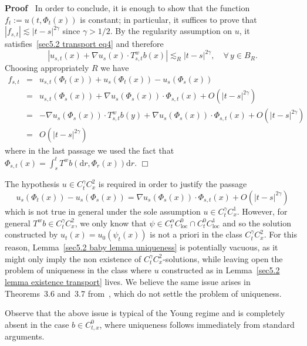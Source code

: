 \documentclass[10pt]{article}
\newcommand{\assign}{:=}
\newcommand{\mathd}{\mathrm{d}}
\newcommand{\tmop}[1]{\ensuremath{\operatorname{#1}}}
\newenvironment{proof}{\noindent\textbf{Proof\ }}{\hspace*{\fill}$\Box$\medskip}
\begin{document}
\begin{proof}
  In order to conclude, it is enough to show that the function $f_t \assign u
  (t, \Phi_t (x))$ is constant; in particular, it suffices to prove that $|
  f_{s, t} | \lesssim | t - s |^{2 \gamma}$ since $\gamma > 1 / 2$. By the
  regularity assumption on $u$, it satisfies~{\eqref{sec5.2 transport eq4}}
  and therefore
  \[ | u_{s, t} (x) + \nabla u_s (x) \cdot T^w_{s, t} b (x) | \lesssim_R | t -
     s |^{2 \gamma}, \quad \forall \, y \in B_R . \]
  Choosing appropriately $R$ we have
  \begin{eqnarray*}
    f_{s, t} & = & u_{s, t} (\Phi_t (x)) + u_s (\Phi_t (x)) - u_s (\Phi_s
    (x))\\
    & = & u_{s, t} (\Phi_s (x)) + \nabla u_s (\Phi_s (x)) \cdot \Phi_{s, t}
    (x) + O (| t - s |^{2 \gamma})\\
    & = & - \nabla u_s (\Phi_s (x)) \cdot T^w_{s, t} b (y) + \nabla u_s
    (\Phi_s (x)) \cdot \Phi_{s, t} (x) + O (| t - s |^{2 \gamma})\\
    & = & O (| t - s |^{2 \gamma})
  \end{eqnarray*}
  where in the last passage we used the fact that $\Phi_{s, t} (x) = \int_s^t
  T^w b (\mathd r, \Phi_r (x)) \mathd r$.
\end{proof}

\begin{remark}
  \label{sec5.2 remark limited use}The hypothesis $u \in C^{\gamma}_t C^2_x$
  is required in order to justify the passage
  \[ u_s (\Phi_t (x)) - u_s (\Phi_s (x)) = \nabla u_s (\Phi_s (x)) \cdot
     \Phi_{s, t} (x) + O (| t - s |^{2 \gamma}) \]
  which is not true in general under the sole assumption $u \in C^{\gamma}_t
  C^1_x$. However, for general $T^w b \in C^{\gamma}_t C^2_x$, we only know
  that $\psi \in C^{\alpha}_t C^0_{\tmop{loc}} \cap C^0_t C^1_{\tmop{loc}}$
  and so the solution constructed by $u_t (x) = u_0 (\psi_t (x))$ is not a
  priori in the class $C^{\gamma}_t C^2_x$. For this reason, Lemma~\ref{sec5.2
  baby lemma uniqueness} is potentially vacuous, as it might only imply the
  non existence of $C^{\gamma}_t C^2_x$\mbox{-}solutions, while leaving open
  the problem of uniqueness in the class where $u$ constructed as in
  Lemma~\ref{sec5.2 lemma existence transport} lives. We believe the same
  issue arises in Theorems~3.6 and~3.7 from~{\cite{hu}}, which do not settle
  the problem of uniqueness.
\end{remark}

Observe that the above issue is typical of the Young regime and is completely
absent in the case $b \in C^0_{t, x}$, where uniqueness follows immediately
from standard arguments.
\end{document}
